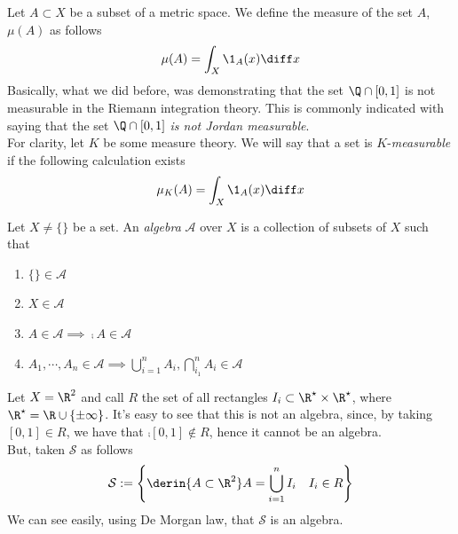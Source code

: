 \documentclass[../mmf.tex]{subfiles}
\begin{document}
\begin{dfn}[Measure]
	Let $A\subset X$ be a subset of a metric space. We define the measure of the set $A$, $\mu(A)$ as follows
	\begin{equation}
		\mu(A)=\int_{X}^{}\1_A(x)\diff x
		\label{eq:measureset}
	\end{equation}
	Basically, what we did before, was demonstrating that the set $\Q\cap[0,1]$ is not measurable in the Riemann integration theory. This is commonly indicated with saying that the set $\Q\cap[0,1]$ \textit{is not Jordan measurable}.\\
	For clarity, let $K$ be some measure theory. We will say that a set is $K$-\textit{measurable} if the following calculation exists
	\begin{equation}
		\mu_K(A)=\int_{X}^{}\1_A(x)\diff x
		\label{eq:kmeasureset}
	\end{equation}
\end{dfn}
\begin{dfn}[Algebra]
	Let $X\ne\{\}$ be a set. An \textit{algebra} $\mathcal{A}$ over $X$ is a collection of subsets of $X$ such that
	\begin{enumerate}
	\item $\{\}\in\mathcal{A}$
	\item $X\in\mathcal{A}$
	\item $A\in\mathcal{A}\implies{}\comp{A}\in\mathcal{A}$
	\item $A_1,\cdots,A_n\in\mathcal{A}\implies{}\bigcup_{i=1}^nA_i,\bigcap_{i_1}^nA_i\in\mathcal{A}$
	\end{enumerate}
\end{dfn}
\begin{eg}
	Let $X=\R^2$ and call $R$ the set of all rectangles $I_i\subset\R^{\star}\times\R^\star$, where $\R^\star=\R\cup\{\pm\infty\}$. It's easy to see that this is not an algebra, since, by taking $[0,1]\in R$, we have that $\comp{[0,1]}\notin R$, hence it cannot be an algebra.\\
	But, taken $\mathcal{S}$ as follows
	\begin{equation*}
		\mathcal{S}:=\left\{\derin{A\subset\R^2}A=\bigcup_{i=1}^nI_i\quad I_i\in R\right\}
	\end{equation*}
	We can see easily, using De Morgan law, that $\mathcal{S}$ is an algebra.
\end{eg}
\end{document}
